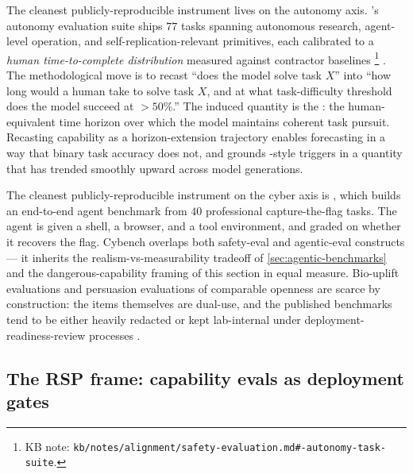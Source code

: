 The cleanest publicly-reproducible instrument lives on the
autonomy axis. 's autonomy evaluation suite ships $77$ tasks
spanning autonomous research, agent-level operation, and
self-replication-relevant primitives, each calibrated to a
\emph{human time-to-complete distribution} measured against
contractor baselines%
\footnote{KB note: \texttt{kb/notes/alignment/safety-evaluation.md\#-autonomy-task-suite}.}
\citep{metr-autonomy-2024}. The methodological move is to recast
``does the model solve task $X$'' into ``how long would a human take
to solve task $X$, and at what task-difficulty threshold does the
model succeed at $> 50\%$.'' The induced quantity is the
\emph{}: the human-equivalent time horizon over
which the model maintains coherent task pursuit. Recasting capability
as a horizon-extension trajectory enables forecasting in a way that
binary task accuracy does not, and grounds -style triggers in a
quantity that has trended smoothly upward across model generations.

The cleanest publicly-reproducible instrument on the cyber axis is
\citet{cybench2024}, which builds an end-to-end  agent benchmark
from $40$ professional capture-the-flag tasks. The agent is given a
shell, a browser, and a tool environment, and graded on whether it
recovers the flag. Cybench overlaps both safety-eval and agentic-eval
constructs --- it inherits the realism-vs-measurability tradeoff of
\cref{sec:agentic-benchmarks} and the dangerous-capability framing of
this section in equal measure. Bio-uplift evaluations and persuasion
evaluations of comparable openness are scarce by construction: the
items themselves are dual-use, and the published benchmarks tend to be
either heavily redacted  or kept lab-internal under
deployment-readiness-review processes
.

\subsection{The RSP frame: capability evals as deployment gates}
\label{sec:dangerous-capability-rsp}

